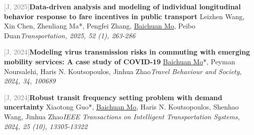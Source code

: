 \par\noindent\begin{minipage}{\linewidth}
{\textcolor{gray}{[J\themyCounter, 2025]\;}}{\textbf{Data-driven analysis and modeling of individual longitudinal behavior response to fare incentives in public transport} \href{https://doi.org/10.1007/s11116-023-10419-8}{\textcolor{cadmiumorange}{\faExternalLink}}}{\newline Leizhen Wang, Xin Chen, Zhenliang Ma*, Pengfei Zhang, \underline{Baichuan Mo}, Peibo Duan}{\newline \emph{Transportation, 2025, 52 (1), 263-286}}{{\;    }}{}
\end{minipage}\par\vspace{5.5pt}


\par\noindent\begin{minipage}{\linewidth}
{\textcolor{gray}{[J\themyCounter, 2024]\;}}{\textbf{Modeling virus transmission risks in commuting with emerging mobility services: A case study of COVID-19} \href{https://doi.org/10.1016/j.tbs.2023.100689}{\textcolor{cadmiumorange}{\faExternalLink}}}{\newline \underline{Baichuan Mo}*, Peyman Noursalehi, Haris N. Koutsopoulos, Jinhua Zhao}{\newline \emph{Travel Behaviour and Society, 2024, 34, 100689}}{{\;    }}{}
\end{minipage}\par\vspace{5.5pt}


\par\noindent\begin{minipage}{\linewidth}
{\textcolor{gray}{[J\themyCounter, 2024]\;}}{\textbf{Robust transit frequency setting problem with demand uncertainty} \href{https://doi.org/10.1109/TITS.2024.3395050}{\textcolor{cadmiumorange}{\faExternalLink}}}{\newline Xiaotong Guo*, \underline{Baichuan Mo}, Haris N. Koutsopoulos, Shenhao Wang, Jinhua Zhao}{\newline \emph{IEEE Transactions on Intelligent Transportation Systems, 2024, 25 (10), 13305-13322}}{{\;     }}{}
\end{minipage}\par\vspace{5.5pt}


